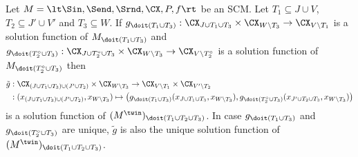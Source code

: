 \begin{Lem}\label{lem:sol_fns_intervened_twin_scm}
Let $M = \lt \Sin, \Send, \Srnd, \CX, P, f \rt$ be an SCM.
Let $T_1 \subseteq J \cup V$, $T_2 \subseteq J' \cup V'$ and $T_3 \subseteq W$. 
If $g_{\doit(T_1\cup T_3)} : \CX_{J \cup T_1 \cup T_3} \times \CX_{W \setminus T_3} \to \CX_{V \setminus T_1}$ is a solution function of $M_{\doit(T_1\cup T_3)}$ 
and $g_{\doit(T_2^\circ\cup T_3)} : \CX_{J \cup T_2^\circ \cup T_3} \times \CX_{W \setminus T_3} \to \CX_{V \setminus T_2^\circ}$ is a solution function of $M_{\doit(T_2^\circ \cup T_3)}$ 
then
  \begin{equation*}\begin{split}
    \tilde{g} & : \CX_{(J \cup T_1 \cup T_3) \cup (J' \cup T_2)} \times \CX_{W \setminus T_3} \to \CX_{V \setminus T_1} \times \CX_{V' \setminus T_2} \\
    & : (x_{(J \cup T_1 \cup T_3) \cup (J' \cup T_2)}, x_{W \setminus T_3}) \mapsto \big(g_{\doit(T_1\cup T_3)}(x_{J \cup T_1 \cup T_3},x_{W\setminus T_3}),g_{\doit(T_2^\circ\cup T_3)}(x_{J' \cup T_2 \cup T_3},x_{W \setminus T_3})\big) 
  \end{split}\end{equation*}
is a solution function of $(M^{\twin})_{\doit(T_1 \cup T_2 \cup T_3)}$.
  In case $g_{\doit(T_1\cup T_3)}$ and $g_{\doit(T_2^\circ \cup T_3)}$ are unique, $\tilde{g}$ is also the
  unique solution function of $(M^{\twin})_{\doit(T_1 \cup T_2 \cup T_3)}$.
\end{Lem}
